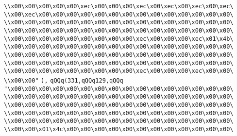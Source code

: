 \verb|\\x00\x00\x00\x00\x00\xec\x00\x00\x00\xec\x00\xec\x00\xec\x00\xec\|\newline
\verb|\\x00\xec\x00\x00\x00\x00\x00\x00\x00\x00\x00\x00\x00\x00\x00\x00\|\newline
\verb|\\x00\x00\x00\x00\x00\x00\x00\x00\x00\x00\x00\x00\x00\x00\x00\x00\|\newline
\verb|\\x00\x00\x00\x00\x00\x00\x00\x00\x00\x00\x00\x00\x00\x00\x00\x00\|\newline
\verb|\\x00\x00\x00\x00\x00\x00\x00\x00\x00\xec\x00\x00\x00\xec\x01\x4b\|\newline
\verb|\\x00\x00\x00\x00\x00\x00\x00\x00\x00\x00\x00\x00\x00\x00\x00\x00\|\newline
\verb|\\x00\x00\x00\x00\x00\x00\x00\x00\x00\x00\x00\x00\x00\x00\x00\x00\|\newline
\verb|\\x00\x00\x00\x00\x00\x00\x00\x00\x00\x00\x00\x00\x00\x00\x00\x00\|\newline
\verb|\\x00\x00\x00\x00\x00\x00\x00\x00\x00\xec\x00\x00\x00\xec\x00\x00\|\newline
\verb|\\x00\x00"|\newline
\verb|),|\newline
\verb|qQQq(331,qQQq129,qQQq|\newline
\verb|"\x00\x00\x00\x00\x00\x00\x00\x00\x00\x00\x00\x00\x00\x00\x00\x00\|\newline
\verb|\\x00\x00\x00\x00\x00\x00\x00\x00\x00\x00\x00\x00\x00\x00\x00\x00\|\newline
\verb|\\x00\x00\x00\x00\x00\x00\x00\x00\x00\x00\x00\x00\x00\x00\x00\x00\|\newline
\verb|\\x00\x00\x00\x00\x00\x00\x00\x00\x00\x00\x00\x00\x00\x00\x00\x00\|\newline
\verb|\\x00\x00\x00\x00\x00\x00\x00\x00\x00\x00\x00\x00\x00\x00\x00\x00\|\newline
\verb|\\x00\x00\x01\x4c\x00\x00\x00\x00\x00\x00\x00\x00\x00\x00\x00\x00\|\newline
